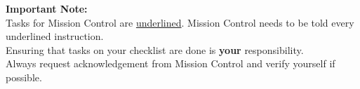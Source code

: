 \begin{tcolorbox}
\color{black}

\textbf{Important Note:}\\
Tasks for Mission Control are \underline{underlined}. Mission Control needs to be told every underlined instruction.\\
Ensuring that tasks on your checklist are done is \textbf{your} responsibility.\\
Always request acknowledgement from Mission Control and verify yourself if possible.
\end{tcolorbox}